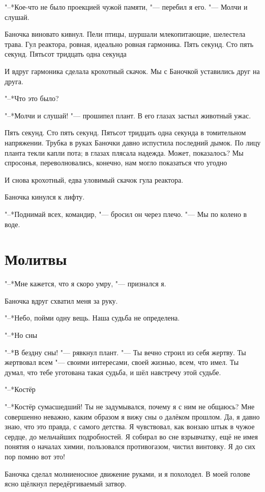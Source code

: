 "--*Кое-что не было проекцией чужой памяти, "--- перебил я его.
"--- Молчи и слушай.

Баночка виновато кивнул.
Пели птицы, шуршали млекопитающие, шелестела трава.
Гул реактора, ровная, идеально ровная гармоника.
Пять секунд.
Сто пять секунд.
Пятьсот тридцать одна секунда\ldotst

И вдруг гармоника сделала крохотный скачок.
Мы с Баночкой уставились друг на друга.

"--*Что это было?

"--*Молчи и слушай! "--- прошипел плант.
В его глазах застыл животный ужас.

Пять секунд.
Сто пять секунд.
Пятьсот тридцать одна секунда в томительном напряжении.
Трубка в руках Баночки давно испустила последний дымок.
По лицу планта текли капли пота;
в глазах плясала надежда.
Может, показалось?
Мы спросонья, переволновались, конечно, нам могло показаться что угодно\ldotst

И снова крохотный, едва уловимый скачок гула реактора.

Баночка кинулся к лифту.

"--*Поднимай всех, командир, "--- бросил он через плечо.
"--- Мы по колено в воде.

\section{Молитвы}

"--*Мне кажется, что я скоро умру, "--- признался я.

Баночка вдруг схватил меня за руку.

"--*Небо, пойми одну вещь.
Наша судьба не определена.

"--*Но сны\ldotst

"--*В бездну сны! "--- рявкнул плант.
"--- Ты вечно строил из себя жертву.
Ты жертвовал всем "--- своими интересами, своей жизнью, всем, что имел.
Ты думал, что тебе уготована такая судьба, и шёл навстречу этой судьбе.

"--*Костёр\ldotst

"--*Костёр сумасшедший!
Ты не задумывался, почему я с ним не общаюсь?
Мне совершенно неважно, каким образом я вижу сны о далёком прошлом.
Да, я давно знаю, что это правда, с самого детства.
Я чувствовал, как вонзаю штык в чужое сердце, до мельчайших подробностей.
Я собирал во сне взрывчатку, ещё не имея понятия о началах химии, пользовался противогазом, чистил винтовку.
Я до сих пор помню вот это!

Баночка сделал молниеносное движение руками, и я похолодел.
В моей голове ясно щёлкнул передёргиваемый затвор.

